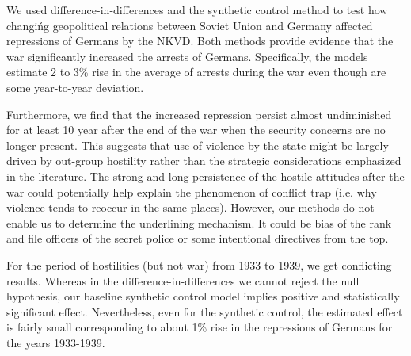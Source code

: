 We used difference-in-differences and the synthetic control method to test how changińg geopolitical relations between Soviet Union and Germany  affected repressions of Germans by the NKVD. 
Both methods provide evidence that the war significantly increased the arrests of Germans.
Specifically, the models estimate 2 to 3\% rise in the average of arrests during the war even though are some year-to-year deviation. 

Furthermore, we find that the increased repression persist almost undiminished for at least 10 year after the end of the war when the security concerns are no longer present.
This  suggests that use of violence by the state might be largely driven by out-group 
hostility rather than the strategic considerations emphasized in the literature. 
The strong and long persistence of the hostile attitudes after the war could potentially help explain the phenomenon of conflict trap (i.e. why violence tends to reoccur in the same places). 
However, our methods do not enable us to determine the underlining mechanism. It could be bias of the rank and file officers of the secret police or some intentional directives from the top. %

For the period of hostilities (but not war) from 1933 to 1939, we get conflicting results. Whereas in the difference-in-differences we cannot reject the null hypothesis, our baseline synthetic control model implies positive and statistically significant effect. Nevertheless, even for the synthetic control, the estimated effect is fairly small corresponding to about 1\% rise in the repressions of Germans for the years 1933-1939.



